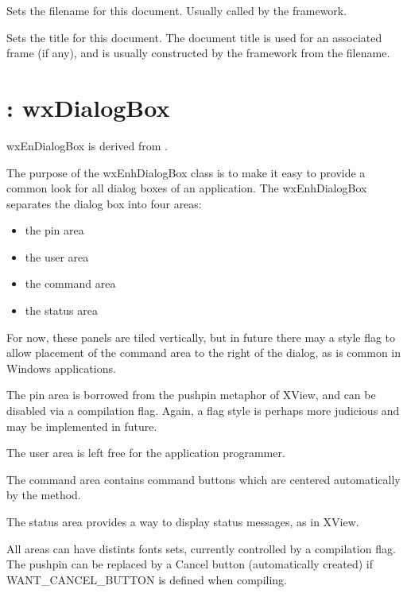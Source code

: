 Sets the filename for this document. Usually called by the framework.



Sets the title for this document. The document title is used for an associated
frame (if any), and is usually constructed by the framework from
the filename.

\section{: wxDialogBox}\label{wxenhdialogbox}

wxEnDialogBox is derived from .

The purpose of the wxEnhDialogBox class is to make it easy to
provide a common look for all dialog boxes of an application. The
wxEnhDialogBox separates the dialog box into four areas:

\begin{itemize}\itemsep=0pt
\item the pin area
\item the user area
\item the command area
\item the status area
\end{itemize}

For now, these panels are tiled vertically, but in future there may a
style flag to allow placement of the command area to the right of the dialog, as
is common in Windows applications.

The pin area is borrowed from the pushpin metaphor of XView, and can be
disabled via a compilation flag. Again, a flag style is perhaps more
judicious and may be implemented in future.

The user area is left free for the application programmer.

The command area contains command buttons which are centered automatically
by the  method.

The status area provides a way to display status messages, as in XView.

All areas can have distints fonts sets, currently controlled by a compilation
flag. The pushpin can be replaced by a Cancel button (automatically created)
if WANT\_CANCEL\_BUTTON is defined when compiling.


